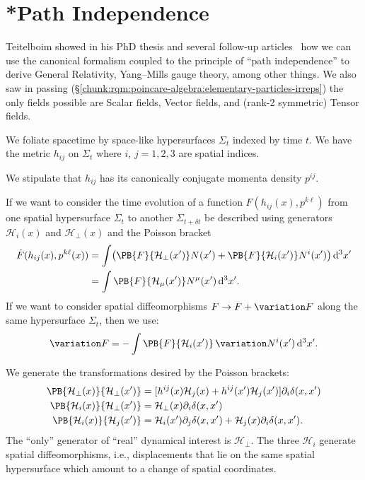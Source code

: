 \section{*Path Independence}

\M Teitelboim showed in his PhD thesis and several follow-up articles~\cite{Hojman:1976vp,Teitelboim:1980hs} how
we can use the canonical formalism coupled to the principle of ``path
independence'' to derive General Relativity, Yang--Mills gauge theory,
among other things. We also saw in passing
(\S\ref{chunk:rqm:poincare-algebra:elementary-particles-irreps}) the
only fields possible are Scalar fields, Vector fields, and (rank-2
symmetric) Tensor fields.

We foliate spacetime by space-like hypersurfaces $\Sigma_{t}$ indexed by
time $t$. We have the metric $h_{ij}$ on $\Sigma_{t}$ where $i$,
$j=1,2,3$ are spatial indices.

We stipulate that $h_{ij}$ has its canonically conjugate momenta density
$p^{ij}$. 

If we want to consider the time evolution of a function $F(h_{ij}(x), p^{k\ell})$
from one spatial hypersurface $\Sigma_{t}$ to another $\Sigma_{t+\delta t}$
be described using generators $\mathcal{H}_{i}(x)$ and $\mathcal{H}_{\bot}(x)$
and the Poisson bracket
\begin{equation}
\begin{split}
\dot{F}(h_{ij}(x),p^{k\ell}(x))
&=\int\bigl(\PB{F}{\mathcal{H}_{\bot}(x')}N(x') + \PB{F}{\mathcal{H}_{i}(x')}N^{i}(x')\bigr)\,\D^{3}x'\\
&=\int\PB{F}{\mathcal{H}_{\mu}(x')}N^{\mu}(x')\,\D^{3}x'.
\end{split}
\end{equation}
If we want to consider spatial diffeomorphisms $F\to F + \variation F$
along the same hypersurface $\Sigma_{t}$, then we use:
\begin{equation}
\variation F = -\int\PB{F}{\mathcal{H}_{i}(x')}\,\variation N^{i}(x')\,\D^{3}x'.
\end{equation}


We generate the transformations desired by the Poisson brackets:
\begin{subequations}
\begin{align}
\PB{\mathcal{H}_{\bot}(x)}{\mathcal{H}_{\bot}(x')} &= [h^{ij}(x)\mathcal{H}_{j}(x) + h^{ij}(x')\mathcal{H}_{j}(x')]\partial_{i}\delta(x,x')\\
\PB{\mathcal{H}_{i}(x)}{\mathcal{H}_{\bot}(x')} &= \mathcal{H}_{\bot}(x)\partial_{i}\delta(x,x')\\
\PB{\mathcal{H}_{i}(x)}{\mathcal{H}_{j}(x')} &= \mathcal{H}_{i}(x')\partial_{j}\delta(x,x')+\mathcal{H}_{j}(x)\partial_{i}\delta(x,x').
\end{align}
\end{subequations}
The ``only'' generator of ``real'' dynamical interest is $\mathcal{H}_{\bot}$.
The three $\mathcal{H}_{i}$ generate spatial diffeomorphisms, i.e.,
displacements that lie on the same spatial hypersurface which amount to
a change of spatial coordinates.

